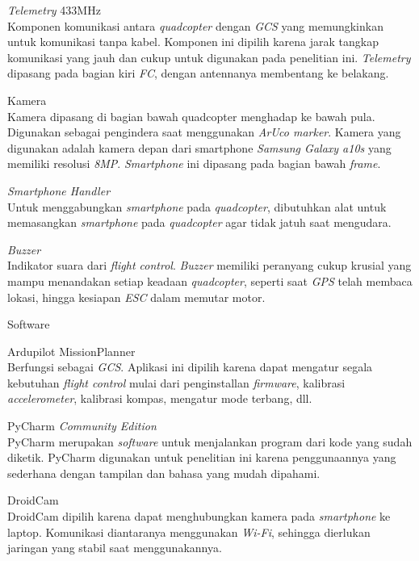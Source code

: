 \begin{packed_enum}
\begin{packed_item}
		\item [g.]\textit{Telemetry} 433MHz
		\\ Komponen komunikasi antara \textit{quadcopter} dengan \textit{GCS} yang memungkinkan untuk komunikasi tanpa kabel. Komponen ini dipilih karena jarak tangkap komunikasi yang jauh dan cukup untuk digunakan pada penelitian ini. \textit{Telemetry} dipasang pada bagian kiri \textit{FC}, dengan antennanya membentang ke belakang.
		\item [h.]Kamera
		\\ Kamera dipasang di bagian bawah quadcopter menghadap ke bawah pula. Digunakan sebagai pengindera saat menggunakan \textit{ArUco marker}. Kamera yang digunakan adalah kamera depan dari smartphone \textit{Samsung Galaxy a10s} yang memiliki resolusi \textit{8MP}. \textit{Smartphone} ini dipasang pada bagian bawah \textit{frame}.
		\item [i.]\textit{Smartphone Handler}
		\\ Untuk menggabungkan \textit{smartphone} pada \textit{quadcopter}, dibutuhkan alat untuk memasangkan \textit{smartphone} pada \textit{quadcopter} agar tidak jatuh saat mengudara.
		\item [j.] \textit{Buzzer}
		\\ Indikator suara dari \textit{flight control}. \textit{Buzzer} memiliki peranyang cukup krusial yang mampu menandakan setiap keadaan \textit{quadcopter}, seperti saat \textit{GPS} telah membaca lokasi, hingga kesiapan \textit{ESC} dalam memutar motor.
	\end{packed_item}
	
	\item Software
	\begin{packed_item}
		\item [a.] Ardupilot MissionPlanner
		\\ Berfungsi sebagai \textit{GCS}. Aplikasi ini dipilih karena dapat mengatur segala kebutuhan \textit{flight control} mulai dari penginstallan \textit{firmware}, kalibrasi \textit{accelerometer}, kalibrasi kompas, mengatur mode terbang, dll.
		\item [b.] PyCharm \textit{Community Edition}
		\\ PyCharm merupakan \textit{software} untuk menjalankan program dari kode yang sudah diketik. PyCharm digunakan untuk penelitian ini karena penggunaannya yang sederhana dengan tampilan dan bahasa yang mudah dipahami.
		\item [c.]DroidCam
		\\ DroidCam dipilih karena dapat menghubungkan kamera pada \textit{smartphone} ke laptop. Komunikasi diantaranya menggunakan \textit{Wi-Fi}, sehingga dierlukan jaringan yang stabil saat menggunakannya.
	\end{packed_item}
\end{packed_enum}

